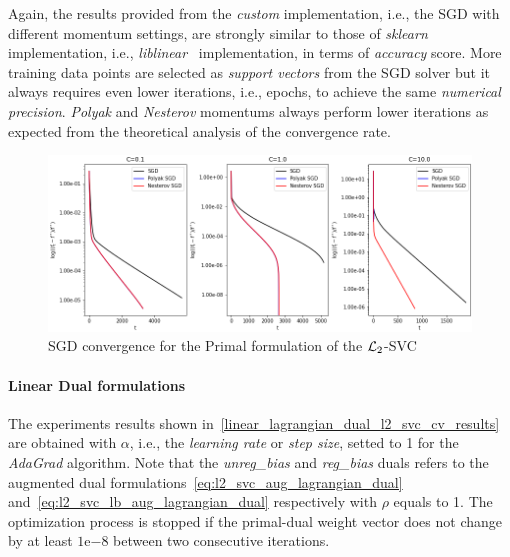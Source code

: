 

Again, the results provided from the \emph{custom} implementation, i.e., the SGD with different momentum settings, are strongly similar to those of \emph{sklearn} implementation, i.e., \emph{liblinear}~\cite{fan2008liblinear} implementation, in terms of \emph{accuracy} score. More training data points are selected as \emph{support vectors} from the SGD solver but it always requires even lower iterations, i.e., epochs, to achieve the same \emph{numerical precision}. \emph{Polyak} and \emph{Nesterov} momentums always perform lower iterations as expected from the theoretical analysis of the convergence rate.

\begin{figure}[H]
	\centering
	\includegraphics[scale=0.55]{img/l2_svc_loss_history}
	\caption{SGD convergence for the Primal formulation of the $\protect \mathcal{L}_2$-SVC}
	\label{fig:l2_svc_loss_history}
\end{figure}

\pagebreak

\paragraph{Linear Dual formulations}

The experiments results shown in~\ref{linear_lagrangian_dual_l2_svc_cv_results} are obtained with $\alpha$, i.e., the \emph{learning rate} or \emph{step size}, setted to 1 for the \emph{AdaGrad} algorithm. Note that the \emph{unreg\_bias} and \emph{reg\_bias} duals refers to the augmented dual formulations~\eqref{eq:l2_svc_aug_lagrangian_dual} and~\eqref{eq:l2_svc_lb_aug_lagrangian_dual} respectively with $\rho$ equals to 1. The optimization process is stopped if the primal-dual weight vector does not change by at least $1\mathrm{e}{-8}$  between two consecutive iterations.



